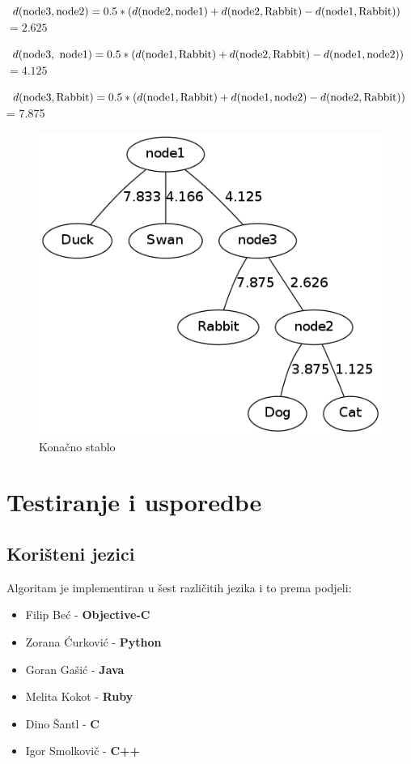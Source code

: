 \documentclass[times, utf8, seminar, numeric]{fer}
\begin{document}
\indent $d(\textup{node3}, \textup{node2}) = 0.5 * (d(\textup{node2}, \textup{node1}) + d(\textup{node2}, \textup{Rabbit}) - d(\textup{node1}, \textup{Rabbit})) $ \newline
\indent $= 2.625$ \newline

\indent $d(\textup{node3},\textup{ node1}) = 0.5 * (d(\textup{node1}, \textup{Rabbit}) + d(\textup{node2}, \textup{Rabbit}) - d(\textup{node1}, \textup{node2})) $ \newline
\indent $=4.125 $ \newline

\indent $d(\textup{node3},\textup{Rabbit}) = 0.5 * (d(\textup{node1}, \textup{Rabbit}) + d(\textup{node1}, \textup{node2}) - d(\textup{node2}, \textup{Rabbit})) $ \newline
\indent = 7.875 \newline


\begin{figure}[htb]
\centering
\includegraphics[scale=0.6]{./img/zadnji.png}
\caption{Konačno stablo}
\end{figure}

\chapter{Testiranje i usporedbe}
\section{Korišteni jezici}
Algoritam je implementiran u šest različitih jezika i to prema podjeli:
\begin{itemize}
	\item Filip Beć - \textbf{Objective-C}
	\item Zorana Ćurković - \textbf{Python}
	\item Goran Gašić - \textbf{Java}
	\item Melita Kokot - \textbf{Ruby}
	\item Dino Šantl - \textbf{C}
	\item Igor Smolkovič - \textbf{C++}
\end{itemize}
\end{document}
